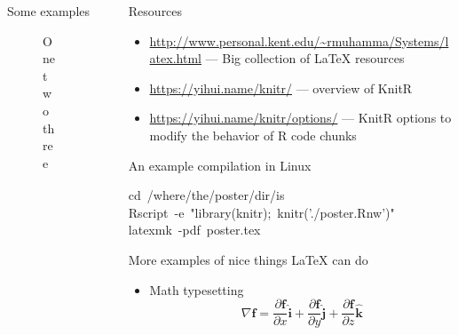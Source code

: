 \documentclass[capfont, final]{beamer}\usepackage[]{graphicx}\usepackage[]{color}
\makeatletter
\newcommand{\hlstr}[1]{\textcolor[rgb]{0.192,0.494,0.8}{#1}}%
\newcommand{\hlopt}[1]{\textcolor[rgb]{0,0,0}{#1}}%
\newcommand{\hlstd}[1]{\textcolor[rgb]{0.345,0.345,0.345}{#1}}%
\newcommand{\hlkwb}[1]{\textcolor[rgb]{0.69,0.353,0.396}{#1}}%
\newenvironment{kframe}{%
 \def\at@end@of@kframe{}%
 \ifinner\ifhmode%
  \def\at@end@of@kframe{\end{minipage}}%
  \begin{minipage}{\columnwidth}%
 \fi\fi%
 \def\FrameCommand##1{\hskip\@totalleftmargin \hskip-\fboxsep
 \colorbox{shadecolor}{##1}\hskip-\fboxsep
     \hskip-\linewidth \hskip-\@totalleftmargin \hskip\columnwidth}%
 \MakeFramed {\advance\hsize-\width
   \@totalleftmargin\z@ \linewidth\hsize
   \@setminipage}}%
 {\par\unskip\endMakeFramed%
 \at@end@of@kframe}
\newenvironment{knitrout}{}{} %
\newlength{\sepwid}
\newlength{\onecolwid}
\newlength{\twocolwid}
\makeatother
\begin{document}
\begin{frame}[t, fragile]
\begin{columns}[T]
\begin{column}{\twocolwid}
\begin{block}{Some examples}
\begin{figure}
\begin{knitrout}
\end{knitrout}
		\caption{One two three}
\end{figure}

				\end{block}
		\end{column} %
		\begin{column}{\sepwid} \end{column} %
		\begin{column}{\onecolwid} %
				\begin{block}{Resources}
					\begin{itemize}
						\item \url{http://www.personal.kent.edu/~rmuhamma/Systems/latex.html} --- Big collection of \LaTeX{} resources
						\item \url{https://yihui.name/knitr/} --- overview of KnitR
						\item \url{https://yihui.name/knitr/options/} --- KnitR options to modify the behavior of R code chunks
					\end{itemize}
				\end{block}
				\begin{block}{An example compilation in Linux}
\begin{knitrout}\small
{}\color{fgcolor}\begin{kframe}
\noindent
\ttfamily
\hlstd{}\hlkwb{cd\ }\hlstd{}\hlopt{/}\hlstd{where}\hlopt{/}\hlstd{the}\hlopt{/}\hlstd{poster}\hlopt{/}\hlstd{dir}\hlopt{/}\hlstd{is\hspace*{\fill}\\
Rscript\ }\hlopt{{-}}\hlstd{e\ }\hlstr{"library(knitr);\ knitr('./poster.Rnw')"}\hlstd{\hspace*{\fill}\\
latexmk\ }\hlopt{{-}}\hlstd{pdf\ poster.tex}\hspace*{\fill}
\mbox{}
\normalfont
\end{kframe}
\end{knitrout}
				\end{block}
				\begin{block}{More examples of nice things \LaTeX{} can do}
					\begin{itemize}
							\item Math typesetting
									\vspace{0.25em}
									\begin{equation}
											\nabla \mathbf{f} = \frac{\partial\mathbf{f}}{\partial x}\mathbf{\hat{i}} + \frac{\partial\mathbf{f}}{\partial y}\mathbf{\hat{j}} + \frac{\partial\mathbf{f}}{\partial z}\mathbf{\hat{k}}

\end{equation}
\end{itemize}
\end{block}
\end{column}
\end{columns}
\end{frame}
\end{document}

